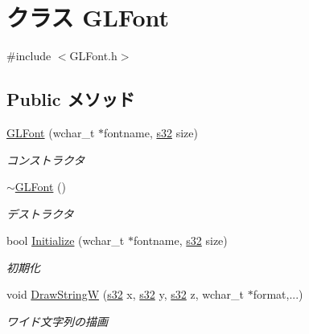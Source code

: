 \hypertarget{class_g_l_font}{\section{クラス G\-L\-Font}
\label{class_g_l_font}
}


{\ttfamily \#include $<$G\-L\-Font.\-h$>$}

\subsection*{Public メソッド}
\begin{DoxyCompactItemize}
\item 
\hyperlink{class_g_l_font_a64c8bf3c90d93c9f7af0e7f1b096e71f}{G\-L\-Font} (wchar\-\_\-t $\ast$fontname, \hyperlink{_main_8h_a0ce6887c26c1c49ad3be5710dd42bfd6}{s32} size)
\begin{DoxyCompactList}\small\item\em コンストラクタ \end{DoxyCompactList}\item 
\hyperlink{class_g_l_font_a7e07e1479cbdd4e31dfc5a39c5d72d69}{$\sim$\-G\-L\-Font} ()
\begin{DoxyCompactList}\small\item\em デストラクタ \end{DoxyCompactList}\item 
bool \hyperlink{class_g_l_font_ae85cae12a5e8d8feec5a076cd4baebcd}{Initialize} (wchar\-\_\-t $\ast$fontname, \hyperlink{_main_8h_a0ce6887c26c1c49ad3be5710dd42bfd6}{s32} size)
\begin{DoxyCompactList}\small\item\em 初期化 \end{DoxyCompactList}\item 
void \hyperlink{class_g_l_font_ad997bbe1b6fce42d07579aa79172fab7}{Draw\-String\-W} (\hyperlink{_main_8h_a0ce6887c26c1c49ad3be5710dd42bfd6}{s32} x, \hyperlink{_main_8h_a0ce6887c26c1c49ad3be5710dd42bfd6}{s32} y, \hyperlink{_main_8h_a0ce6887c26c1c49ad3be5710dd42bfd6}{s32} z, wchar\-\_\-t $\ast$format,...)
\begin{DoxyCompactList}\small\item\em ワイド文字列の描画 \end{DoxyCompactList}\end{DoxyCompactItemize}
